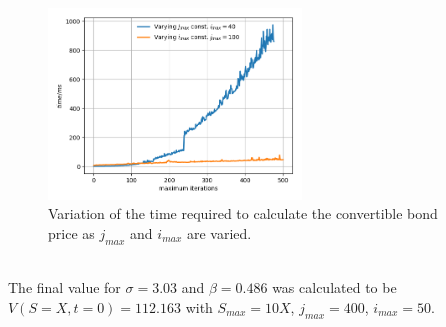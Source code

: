 \documentclass{article}
\begin{document}
\begin{figure}[!h]
\includegraphics[width=0.6\textwidth,center]{../images/european_time.png}
\caption{Variation of the time required to calculate the convertible bond price as $j_{max}$ and $i_{max}$ are varied.}
\label{fig:varying_smax}
\end{figure}
\\
The final value for $\sigma=3.03$ and $\beta=0.486$ was calculated to be $V(S=X,t=0)=112.163$ with $S_{max}=10X$, $j_{max}=400$, $i_{max}=50$.
\end{document}
